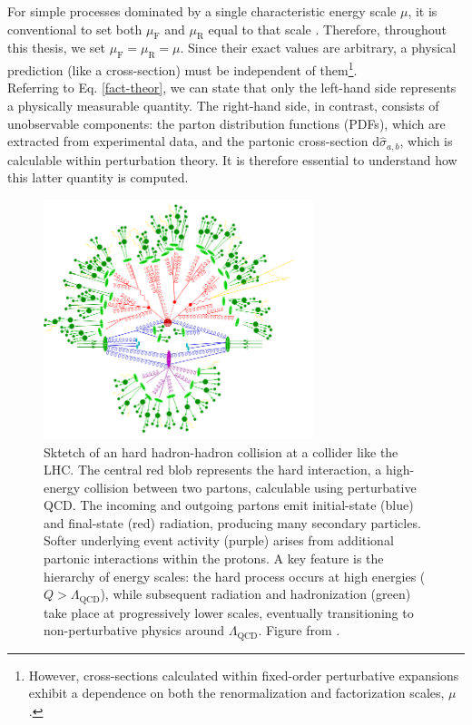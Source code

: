 \documentclass[a4paper, 12pt]{book}
\begin{document}
For simple processes dominated by a single characteristic energy scale $\mu$, it is conventional to set both $\mu_\text{F}$ and $\mu_\text{R}$ equal to that scale \cite{Campbell:2017}. Therefore, throughout this thesis, we set $\mu_\text{F} = \mu_\text{R} = \mu$. Since their exact values are arbitrary, a physical prediction (like a cross-section) must be independent of them\footnote{However, cross-sections calculated within fixed-order perturbative expansions exhibit a dependence on both the renormalization and factorization scales, $\mu$.}.  \\
Referring to Eq. \ref{fact-theor}, we can state that only the left-hand side represents a physically measurable quantity. The right-hand side, in contrast, consists of unobservable components: the parton distribution functions (PDFs), which are extracted from experimental data, and the partonic cross-section $\mathrm{d}\hat{\sigma}_{a,b}$, which is calculable within perturbation theory. It is therefore essential to understand how this latter quantity is computed.

\begin{figure}[!ht]
	\centering
	\includegraphics[width=0.7\textwidth]{imgs/hadron-collision.png}
	\caption{Sktetch of an hard hadron-hadron collision at a collider like the LHC. The central red blob represents the hard interaction, a high-energy collision between two partons, calculable using perturbative QCD. The incoming and outgoing partons emit initial-state (blue) and final-state (red) radiation, producing many secondary particles. Softer underlying event activity (purple) arises from additional partonic interactions within the protons. A key feature is the hierarchy of energy scales: the hard process occurs at high energies ($Q>\Lambda_{\text{QCD}}$), while subsequent radiation and hadronization (green) take place at progressively lower scales, eventually transitioning to non-perturbative physics around $\Lambda_{\text{QCD}}$. Figure from \cite{Hoeche:2014}.}
	\label{hadron-collision}
\end{figure}
\end{document}
